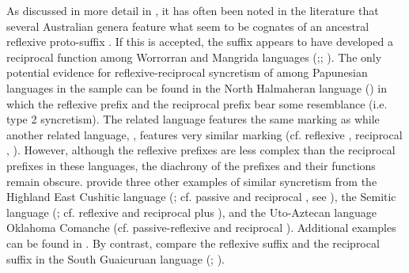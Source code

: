 As discussed in more detail in , it has often been noted in the literature that several Australian genera feature what seem to be cognates of an ancestral reflexive proto-suffix . If this  is accepted, the suffix appears to have developed a reciprocal function among Worrorran and Mangrida languages (\citealt[341ff.]{alpher:al:2003};; \citealt[388]{green:2003}). The only potential evidence for reflexive-reciprocal syncretism of  among Papunesian languages in the sample can be found in the North Halmaheran language  () in which the reflexive prefix  and the reciprocal prefix  bear some resemblance (i.e. type 2 syncretism). The related language  features the same marking as  \citep[244]{nedjalkov:2007d} while another related language, , features very similar marking (cf. reflexive , reciprocal , \citealt[199]{heine:miyashita:2008}). However, although the reflexive prefixes are less complex than the reciprocal prefixes in these languages, the diachrony of the prefixes and their functions remain obscure. \citet[198f.]{heine:miyashita:2008} provide three other examples of similar syncretism from the Highland East Cushitic language  (; cf. passive  and reciprocal , see ), the Semitic language  (; cf. reflexive  and reciprocal  plus ), and the Uto-Aztecan language Oklahoma Comanche (cf. passive-reflexive  and reciprocal ). Additional examples can be found in . By contrast, compare the reflexive suffix  and the reciprocal suffix  in the South Guaicuruan language  (; \citealt[171f., 201ff.]{vidal:2001}). 

